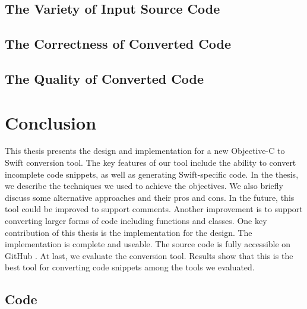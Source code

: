 \documentclass{sfuthesis}
\begin{document}
\section{The Variety of Input Source Code}

\section{The Correctness of Converted Code}

\section{The Quality of Converted Code}

\chapter{Conclusion}

This thesis presents the design and implementation for a new Objective-C to Swift conversion tool. The key features of our tool include the ability to convert incomplete code snippets, as well as generating Swift-specific code. In the thesis, we describe the techniques we used to achieve the objectives. We also briefly discuss some alternative approaches and their pros and cons. In the future, this tool could be improved to support comments. Another improvement is to support converting larger forms of code including functions and classes.
One key contribution of this thesis is the implementation for the design. The implementation is complete and useable. The source code is fully accessible on GitHub \cite{babelswift}. At last, we evaluate the conversion tool. Results show that this is the best tool for converting code snippets among the tools we evaluated.


%
%
%
%
%

\backmatter%
	
	

\begin{appendices} %
	\chapter{Code}
\end{appendices}
\end{document}
